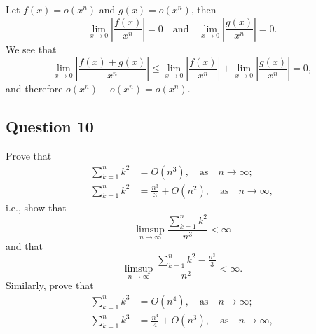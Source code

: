 Let $ f(x) = o(x^n) $ and $ g(x) = o(x^n) $, then
\begin{equation*}
    \lim_{x \rightarrow 0} \left| \frac{f(x)}{x^n} \right| = 0 \quad \text{and} \quad \lim_{x \rightarrow 0} \left| \frac{g(x)}{x^n} \right| = 0.
\end{equation*}
We see that
\begin{equation*}
    \lim_{x \rightarrow 0} \left| \frac{f(x) + g(x)}{x^n} \right| \leq \lim_{x \rightarrow 0} \left| \frac{f(x)}{x^n} \right| + \lim_{x \rightarrow 0} \left| \frac{g(x)}{x^n} \right| = 0,
\end{equation*}
and therefore $ o(x^n) + o(x^n) = o(x^n) $.

\subsection{Question 10}
Prove that
\begin{align*}
    \sum_{k=1}^{n} k^2 &= O(n^3), \quad \text{as} \quad n \rightarrow \infty; \\
    \sum_{k=1}^{n} k^2 &= \frac{n^3}{3} + O(n^2), \quad \text{as} \quad n \rightarrow \infty,
\end{align*}
i.e., show that
\begin{equation*}
    \limsup_{n \rightarrow \infty} \frac{\sum_{k=1}^{n} k^2}{n^3} < \infty
\end{equation*}
and that
\begin{equation*}
    \limsup_{n \rightarrow \infty} \frac{\sum_{k=1}^{n} k^2 - \frac{n^3}{3}}{n^2} < \infty.
\end{equation*}
Similarly, prove that
\begin{align*}
    \sum_{k=1}^{n} k^3 &= O(n^4), \quad \text{as} \quad n \rightarrow \infty; \\
    \sum_{k=1}^{n} k^3 &= \frac{n^4}{4} + O(n^3), \quad \text{as} \quad n \rightarrow \infty,
\end{align*}


